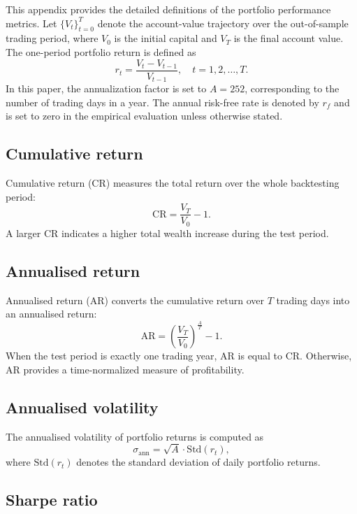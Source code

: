 \documentclass[pdflatex,sn-mathphys-num]{sn-jnl}%
\theoremstyle{thmstyleone}%
\theoremstyle{thmstyletwo}%
\theoremstyle{thmstylethree}%
\begin{document}
This appendix provides the detailed definitions of the portfolio performance metrics.
Let $\{V_t\}_{t=0}^{T}$ denote the account-value trajectory over the out-of-sample trading period, where $V_0$ is the initial capital and $V_T$ is the final account value.
The one-period portfolio return is defined as
\begin{equation}
r_t=\frac{V_t-V_{t-1}}{V_{t-1}}, \quad t=1,2,\ldots,T .
\end{equation}
In this paper, the annualization factor is set to $A=252$, corresponding to the number of trading days in a year.
The annual risk-free rate is denoted by $r_f$ and is set to zero in the empirical evaluation unless otherwise stated.

\subsection{Cumulative return}

Cumulative return (CR) measures the total return over the whole backtesting period:
\begin{equation}
\mathrm{CR}=\frac{V_T}{V_0}-1 .
\end{equation}
A larger CR indicates a higher total wealth increase during the test period.

\subsection{Annualised return}

Annualised return (AR) converts the cumulative return over $T$ trading days into an annualised return:
\begin{equation}
\mathrm{AR}=
\left(\frac{V_T}{V_0}\right)^{\frac{A}{T}}-1 .
\end{equation}
When the test period is exactly one trading year, AR is equal to CR.
Otherwise, AR provides a time-normalized measure of profitability.

\subsection{Annualised volatility}

The annualised volatility of portfolio returns is computed as
\begin{equation}
\sigma_{\mathrm{ann}}=\sqrt{A}\cdot \mathrm{Std}(r_t),
\end{equation}
where $\mathrm{Std}(r_t)$ denotes the standard deviation of daily portfolio returns.

\subsection{Sharpe ratio}
\end{document}
